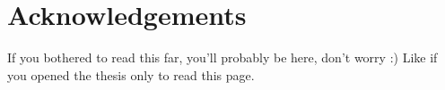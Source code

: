 \documentclass[oneside,11pt]{Classes/PhDthesisPSnPDF}
\begin{document}
\chapter*{Acknowledgements}

If you bothered to read this far, you'll probably be here, don't worry :)
\newline\newline\newline
{} Like if you opened the thesis only to read this page.
\end{document}
